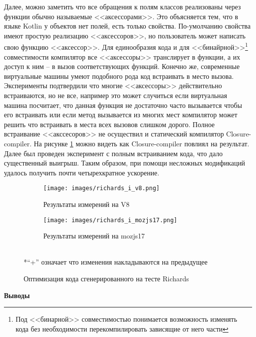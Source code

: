 Далее, можно заметить что все обращения к полям классов реализованы через функции обычно называемые <<аксессорами>>. Это объясняется тем, что в языке Kotlin у объектов нет полей, есть только свойства. По-умолчанию свойства имеют простую реализацию <<аксессоров>>, но пользователь может написать свою функцию <<аксессор>>. Для единообразия кода и для <<бинайрной>>\footnote{Под <<бинарной>> совместимостью понимается возможность изменять кода без необходимости перекомпилировать зависящие от него части}
совместимости компилятор все <<аксессоры>> транслирует в функции, а их доступ к ним -- в вызов соответствующих функций. Конечно же, современные виртуальные машины умеют подобного рода код встраивать в место вызова. Эксперименты подтвердили что многие <<аксессоры>> действительно встраиваются, но не все, например это может случиться если виртуальная машина посчитает, что данная функция не достаточно часто вызывается чтобы его встраивать или если  метод вызывается из многих мест компилятор может решить что встраивать в места всех вызовов слишком дорого. 
Полное встраивание <<акссесоров>> не осуществил и статический компилятор Closure-compiler. На рисунке \ref{richards_i} можно видеть как Closure-compiler повлиял на результат.
Далее был проведен эксперимент с полным встраиванием кода, что дало существенный выигрыш. Таким образом, при помощи несложных модификаций удалось получить почти четырехкратное ускорение. 

\begin{figure}[ht!]
\centering
	\begin{subfigure}[b]{0.7\textwidth}
	\centering
	\texttt{[image: images/richards\_i\_v8.png]}
	\caption{Результаты измерений на V8}
    \end{subfigure}

  	\begin{subfigure}[b]{0.7\textwidth}
	\centering
	\texttt{[image: images/richards\_i\_mozjs17.png]}
	\caption{Результаты измерений на mozjs17}
    \end{subfigure}
\\*``+'' означает что изменения накладываются на предыдущее
\caption{Оптимизация кода сгенерированного на тесте Richards}
\label{richards_i}
\end{figure}

\null
\begin{LARGE}
\begin{center}
\textbf{Выводы}
\end{center}
\end{LARGE}

